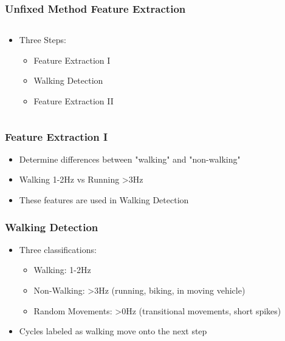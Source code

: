 \documentclass{beamer}
\begin{document}
\begin{frame}
  \frametitle{Unfixed Method Feature Extraction}
  \begin{columns}
  \begin{column}{.5\textwidth}
  \begin{itemize}
  	\item Three Steps:
  	\begin{itemize}
  		\item Feature Extraction I
  		\linebreak
  		\item Walking Detection
  		\linebreak
  		\item Feature Extraction II
  	\end{itemize}
  \end{itemize}
  \end{column}
  \begin{column}{0.6\textwidth}
       \\
  \end{column}
  \end{columns}
\end{frame}



\begin{frame}
\frametitle{Feature Extraction I}
	\begin{itemize}
		\item Determine differences between "walking" and "non-walking"
		\linebreak
		\item Walking 1-2Hz vs Running >3Hz 
		\linebreak
		\item These features are used in Walking Detection
		
	\end{itemize}
	
\end{frame}

\begin{frame}
\frametitle{Walking Detection}
	\begin{itemize}
		\item Three classifications:
			\begin{itemize}
				\item Walking: 1-2Hz
				\linebreak
				\item Non-Walking: >3Hz (running, biking, in moving vehicle)
				\linebreak
				\item Random Movements: >0Hz (transitional movements, short spikes)
				\linebreak
			\end{itemize}
			
		\item Cycles labeled as walking move onto the next step
	\end{itemize}
\end{frame}
\end{document}
